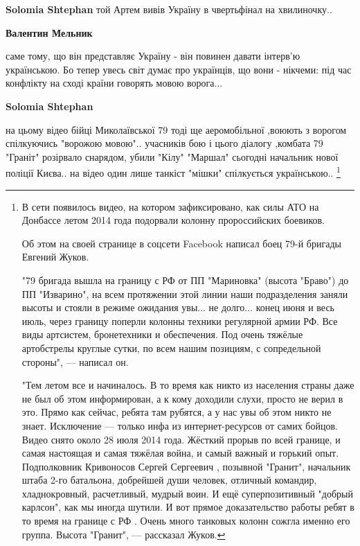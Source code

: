\begin{itemize}
\begin{itemize}
\textbf{Solomia Shtephan} той Артем вивів Україну в чвертьфінал на хвилиночку..

 
\textbf{Валентин Мельник} 

саме тому, що він представляє Україну - він повинен давати інтерв'ю
українською. Бо тепер увесь світ думає про українців, що вони - нікчеми: під
час конфлікту на сході країни говорять мовою ворога...


 
\textbf{Solomia Shtephan} 

на цьому відео бійці Миколаївської 79 тоді ще аеромобільної ,воюють з ворогом
спілкуючись "ворожою мовою".. учасників бою і цього діалогу ,комбата 79
"Граніт" розірвало снарядом, убили "Кілу" "Маршал" сьогодні начальник нової
поліції Києва.. на відео один лише танкіст "мішки" спілкується українською..
\footnote{
В сети появилось видео, на котором зафиксировано, как силы АТО на Донбассе
летом 2014 года подорвали колонну пророссийских боевиков.

Об этом на своей странице в соцсети Facebook написал боец 79-й бригады Евгений Жуков.

"79 бригада вышла на границу с РФ от ПП "Мариновка" (высота "Браво") до ПП
"Изварино", на всем протяжении этой линии наши подразделения заняли высоты и
стояли в режиме ожидания увы... не долго... конец июня и весь июль, через
границу поперли колонны техники регулярной армии РФ. Все виды артсистем,
бронетехники и обеспечения. Под очень тяжёлые артобстрелы круглые сутки, по
всем нашим позициям, с сопредельной стороны", — написал он.

"Тем летом все и начиналось. В то время как никто из населения страны даже не
был об этом информирован, а к кому доходили слухи, просто не верил в это. Прямо
как сейчас, ребята там рубятся, а у нас увы об этом никто не знает. Исключение
— только инфа из интернет-ресурсов от самих бойцов. Видео снято около 28 июля
2014 года. Жёсткий прорыв по всей границе, и самая настоящая и самая тяжёлая
война, и самый важный и горький опыт. Подполковник Кривоносов Сергей Сергеевич
, позывной "Гранит", начальник штаба 2-го батальона, добрейшей души человек,
отличный командир, хладнокровный, расчетливый, мудрый воин. И ещё
суперпозитивный "добрый карлсон", как мы иногда шутили. И вот прямое
доказательство работы ребят в то время на границе с РФ . Очень много танковых
колонн сожгла именно его группа. Высота "Гранит", — рассказал Жуков.

}
\end{itemize}
\end{itemize}
